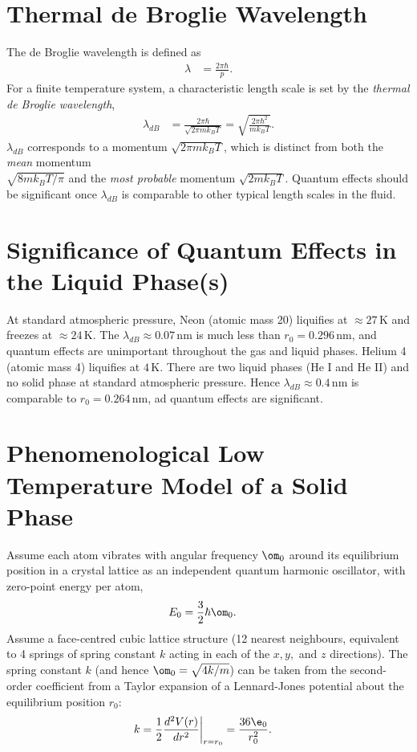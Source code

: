 \documentclass[qo.tex]{subfiles}
\begin{document}
\section{Thermal de Broglie Wavelength}
The de Broglie wavelength is defined as 
\begin{align}
    \lambda &= \frac{2\pi\hbar}{p}.
\end{align}
For a finite temperature system, a characteristic length scale is set by the \emph{thermal de Broglie wavelength},
\begin{align}
    \lambda_{dB} &= \frac{2\pi\hbar}{\sqrt{2\pi mk_BT}} = \sqrt{\frac{2\pi\hbar^2}{mk_BT}}.
\end{align}
$\lambda_{dB}$ corresponds to a momentum $\sqrt{2\pi mk_BT}$, which is distinct from both the \emph{mean} momentum \\ $\sqrt{8mk_BT/\pi}$ and the \emph{most probable} momentum $\sqrt{2mk_BT}$.
Quantum effects should be significant once $\lambda_{dB}$ is comparable to other typical length scales in the fluid. 

\section{Significance of Quantum Effects in the Liquid Phase(s)}
At standard atmospheric pressure, Neon (atomic mass 20) liquifies at $\approx27\,$K and freezes at $\approx24\,$K.
The $\lambda_{dB}\approx0.07\,$nm is much less than $r_0=0.296\,$nm, and quantum effects are unimportant throughout the gas and liquid phases. 
Helium 4 (atomic mass 4) liquifies at $4\,$K.
There are two liquid phases (He I and He II) and no solid phase at standard atmospheric pressure. 
Hence $\lambda_{dB}\approx0.4\,$nm is comparable to $r_0=0.264\,$nm, ad quantum effects are significant.

\section{Phenomenological Low Temperature Model of a Solid Phase}
Assume each atom vibrates with angular frequency $\om_0$ around its equilibrium position in a crystal lattice as an independent quantum harmonic oscillator, with zero-point energy per atom,
\begin{align}
    E_0 &= \frac32\hbar\om_0.
\end{align}
Assume a face-centred cubic lattice structure (12 nearest neighbours, equivalent to 4 springs of spring constant $k$ acting in each of the $x,y,$ and $z$ directions).
The spring constant $k$ (and hence $\om_0=\sqrt{4k/m}$) can be taken from the second-order coefficient from a Taylor expansion of a Lennard-Jones potential about the equilibrium position $r_0$:
\begin{align}
    k &= \frac12 \frac{d^2V(r)}{dr^2}\bigg|_{r=r_0} = \frac{36\e_0}{r^2_0}.
\end{align}
\end{document}
